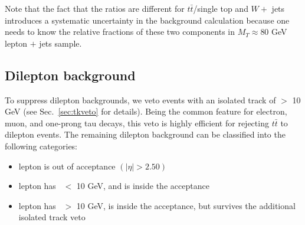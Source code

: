 Note that the fact that the ratios are different for 
$t\bar{t}$/single top and $W +$ jets introduces a systematic
uncertainty in the background calculation because one needs
to know the relative fractions of these two components in 
$M_T \approx 80$ GeV lepton $+$ jets sample.


\subsection{Dilepton background}
\label{sec:dil-general}

To suppress dilepton backgrounds, we veto events with an isolated track of \pt $>$ 10 GeV (see Sec.~\ref{sec:tkveto} for details). 
Being the common feature for electron, muon, and one-prong
tau decays, this veto is highly efficient for rejecting 
$t\bar{t}$ to dilepton events. The remaining dilepton background can be classified into the following categories:

\begin{itemize}
\item lepton is out of acceptance $(|\eta| > 2.50)$
\item lepton has \pt\ $<$ 10 GeV, and is inside the acceptance
\item lepton has \pt\ $>$ 10 GeV, is inside the acceptance, but survives the additional isolated track veto
\end{itemize}


